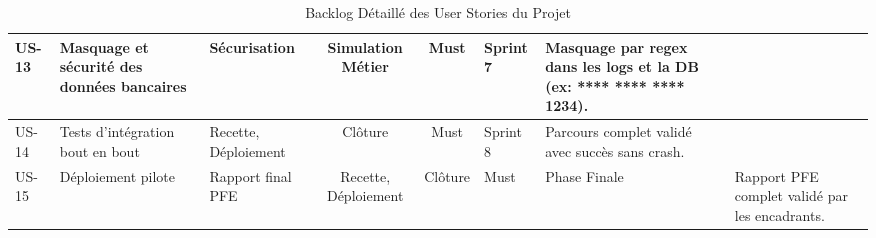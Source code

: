 \begin{table}[htbp]
\begin{tabular}{|l|p{3.5cm}|p{3.5cm}|c|c|p{3.5cm}|}
US-13 & Masquage et sécurité des données bancaires & Sécurisation & Simulation Métier & Must & Sprint 7 & Masquage par regex dans les logs et la DB (ex: **** **** **** 1234). \\ \hline
US-14 & Tests d'intégration bout en bout & Recette, Déploiement & Clôture & Must & Sprint 8 & Parcours complet validé avec succès sans crash. \\ \hline
US-15 & Déploiement pilote & Rapport final PFE & Recette, Déploiement & Clôture & Must & Phase Finale & Rapport PFE complet validé par les encadrants. \\ \hline
\end{tabular}
\caption{Backlog Détaillé des User Stories du Projet}
\label{tab:stories_jira}
\end{table}
